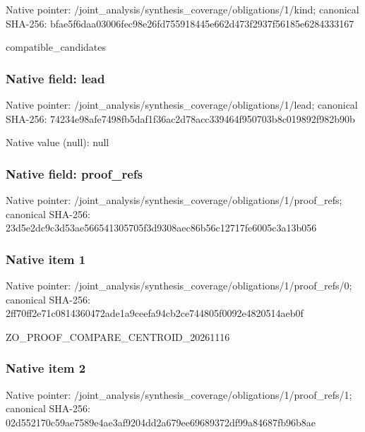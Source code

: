 \documentclass[10pt,a4paper]{article}
\begin{document}
Native pointer: /joint\_analysis/synthesi\allowbreak{}s\_coverage/obligations/1\allowbreak{}/kind; canonical SHA-256: bfae5f6daa03006fec98e26f\allowbreak{}d755918445e662d473f2937f\allowbreak{}56185e6284333167


compatible\_candidates


\subsubsection{Native field: lead}


Native pointer: /joint\_analysis/synthesi\allowbreak{}s\_coverage/obligations/1\allowbreak{}/lead; canonical SHA-256: 74234e98afe7498fb5daf1f3\allowbreak{}6ac2d78acc339464f950703b\allowbreak{}8c019892f982b90b



Native value (null): null



\subsubsection{Native field: proof\_refs}


Native pointer: /joint\_analysis/synthesi\allowbreak{}s\_coverage/obligations/1\allowbreak{}/proof\_refs; canonical SHA-256: 23d5e2dc9c3d53ae56654130\allowbreak{}5705f3d9308aec86b56c1271\allowbreak{}7fe6005c3a13b056



\subsubsection{Native item 1}


Native pointer: /joint\_analysis/synthesi\allowbreak{}s\_coverage/obligations/1\allowbreak{}/proof\_refs/0; canonical SHA-256: 2ff70ff2e71c0814360472ad\allowbreak{}e1a9ceefa94cb2ce744805f0\allowbreak{}092e4820514aeb0f


ZO\_PROOF\_COMPARE\_CENTROID\_20261116


\subsubsection{Native item 2}


Native pointer: /joint\_analysis/synthesi\allowbreak{}s\_coverage/obligations/1\allowbreak{}/proof\_refs/1; canonical SHA-256: 02d552170c59ae7589e4ae3a\allowbreak{}f9204dd2a679ee69689372df\allowbreak{}99a84687fb96b8ae
\end{document}
